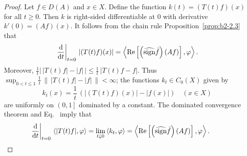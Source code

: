 \begin{proof}
Let $f \in D(A)$ and $x \in X$.
Define the function $k(t) = (T(t)f)(x)$ for all $t \geq 0$.
Then $k$ is right-sided differentiable at $0$ with derivative $k'(0) = (Af)(x)$.
It follows from the chain rule Proposition~\ref{prop:b2-2.3} that
\begin{equation}\label{eq:b2-2.11}
\left.\frac{\diff{}}{\dt}
\right|_{t = 0}\, |(T(t)f)(x)| = \left\langle \Re\left[\left(\widehat{\sign} \bar{f}\right)(Af)\right],\phi \right\rangle.
\end{equation}
Moreover, $\frac{1}{t} \left|\, |T(t)f| - |f| \, \right| \leq \frac{1}{t}\, |T(t)f - f|$.
Thus $\sup_{0 < t \leq 1} \frac{1}{t}\, \|\, |T(t)f| - |f|\, \| < \infty$; \ie  the functions $k_{t} \in C_{0}(X)$ given by
\begin{equation}\label{eq:b2-2.12}
k_{t}(x) = \frac{1}{t}\,(|(T(t)f)(x)| - |f(x)|) \quad (x \in X)
\end{equation}
are uniformly on $\left(0,1\right]$ dominated by a constant.
The dominated convergence theorem and Eq.~ imply that
\begin{align*}
\left.\frac{\diff{}}{\dt}\right|_{t=0}\, \langle |T(t)f|,\phi \rangle = \lim_{t \downarrow 0}\, \langle k_{t},\phi \rangle = \left\langle \Re\left[\left(\widehat{\sign} \bar{f}\right)(Af)\right],\phi \right\rangle .
\tag*{\qedsymbol}%
\end{align*}
\let\qedsymbol\relax
\end{proof}
